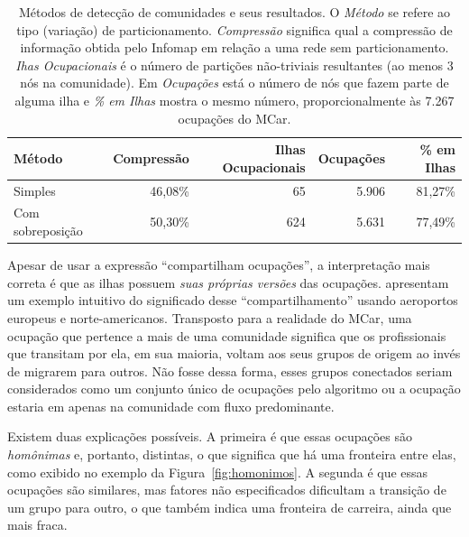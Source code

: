 \documentclass[
  article,
  11pt,
  a4paper,
  english,
  brazil,
  sumario=tradicional]{abntex2}
\begin{document}
\begin{table}
  \centering
  \begin{tabular}{@{} l r r r r @{}}
  	\toprule
  	Método           & Compressão & Ilhas Ocupacionais & Ocupações & \% em Ilhas \\ \midrule
  	Simples          & 46,08\%    & 65                 & 5.906     & 81,27\%     \\
  	Com sobreposição & 50,30\%    & 624                & 5.631     & 77,49\%     \\ \bottomrule
  \end{tabular}
  \caption{Métodos de detecção de comunidades e seus resultados. O \textit{Método} se refere ao tipo (variação) de particionamento. \textit{Compressão} significa qual a compressão de informação obtida pelo Infomap em relação a uma rede sem particionamento. \textit{Ihas Ocupacionais} é o número de partições não-triviais resultantes (ao menos 3 nós na comunidade). Em \textit{Ocupações} está o número de nós que fazem parte de alguma ilha e \textit{\% em Ilhas} mostra o mesmo número, proporcionalmente às 7.267 ocupações do MCar.}
  \label{tab:metodos}
\end{table}

Apesar de usar a expressão \enquote{compartilham ocupações}, a interpretação mais correta é que as ilhas possuem \textit{suas próprias versões} das ocupações.  apresentam um exemplo intuitivo do significado desse \enquote{compartilhamento} usando aeroportos europeus e norte-americanos. Transposto para a realidade do MCar, uma ocupação que pertence a mais de uma comunidade significa que os profissionais que transitam por ela, em sua maioria, voltam aos seus grupos de origem ao invés de migrarem para outros. Não fosse dessa forma, esses grupos conectados seriam considerados como um conjunto único de ocupações pelo algoritmo ou a ocupação estaria em apenas na comunidade com fluxo predominante.

Existem duas explicações possíveis. A primeira é que essas ocupações são \textit{homônimas} e, portanto, distintas, o que significa que há uma fronteira entre elas, como exibido no exemplo da Figura~\ref{fig:homonimos}. A segunda é que essas ocupações são similares, mas fatores não especificados dificultam a transição de um grupo para outro, o que também indica uma fronteira de carreira, ainda que mais fraca.
\end{document}
